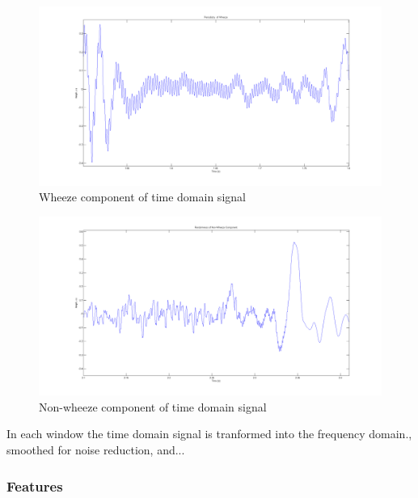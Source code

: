\documentclass{article}
\begin{document}
\begin{figure}[H]
	\includegraphics[width=\linewidth]{images/WheezePeriodicity.png}
	\caption{Wheeze component of time domain signal}
 	\label{fig:WheezePeriodicity}
\end{figure}
\begin{figure}[H]
	\includegraphics[width=\linewidth]{images/WheezeRandomness.png}
	\caption{Non-wheeze component of time domain signal}
 	\label{fig:WheezeRandomness}
\end{figure}

In each window the time domain signal is tranformed into the frequency domain., smoothed for noise reduction, and...\\

\subsubsection{Features}
\end{document}
